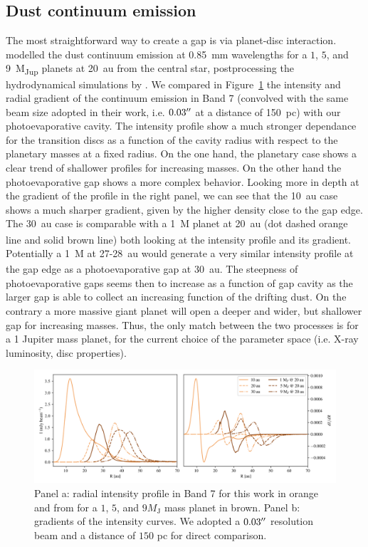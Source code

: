 \documentclass[fleqn,usenatbib]{mnras}
\begin{document}
    \subsection{Dust continuum emission}
    The most straightforward way to create a gap is via planet-disc interaction. \citet{Facchini2018} modelled the dust continuum emission at \SI{0.85}{mm} wavelengths for a $1$, $5$, and \SI{9}{M_{Jup}} planets at \SI{20}{au} from the central star, postprocessing the hydrodynamical simulations by \cite{Ovelar2016}. We compared in Figure~\ref{fig:Grad} the intensity and radial gradient of the continuum emission in Band 7 (convolved with the same beam size adopted in their work, i.e. $0.03 \hbox{$^{\prime\prime}$}$ at a distance of \SI{150}{pc}) with our photoevaporative cavity. The intensity profile show a much stronger dependance for the transition discs as a function of the cavity radius with respect to the planetary masses at a fixed radius. On the one hand, the planetary case shows a clear trend of shallower profiles for increasing masses. On the other hand the photoevaporative gap shows a more complex behavior. Looking more in depth at the gradient of the profile in the right panel, we can see that the \SI{10}{au} case shows a much sharper gradient, given by the higher density close to the gap edge. The \SI{30}{au} case is comparable with a \SI{1}{M_\J} planet at \SI{20}{au} (dot dashed orange line and solid brown line) both looking at the intensity profile and its gradient. Potentially a \SI{1}{M_\J} at 27-\SI{28}{au} would generate a very similar intensity profile at the gap edge as a photoevaporative gap at \SI{30}{au}. The steepness of photoevaporative gaps seems then to increase as a function of gap cavity as the larger gap is able to collect an increasing function of the drifting dust. On the contrary a more massive giant planet will open a deeper and wider, but shallower gap for increasing masses. Thus, the only match between the two processes is for a 1 Jupiter mass planet, for the current choice of the parameter space (i.e. X-ray luminosity, disc properties).
    \begin{figure}
        \centering
        \includegraphics[width=\textwidth]{gradI.png}
        \caption{Panel a: radial intensity profile in Band 7 for this work in orange and from \citet{Ovelar2016,Facchini2018} for a $1$, $5$, and $9 M_\mathrm{J}$ mass planet in brown. Panel b: gradients of the intensity curves. We adopted a $0.03 \hbox{$^{\prime\prime}$}$ resolution beam and a distance of $150$ pc for direct comparison.}
        \label{fig:Grad}
    \end{figure}
    
\end{document}
